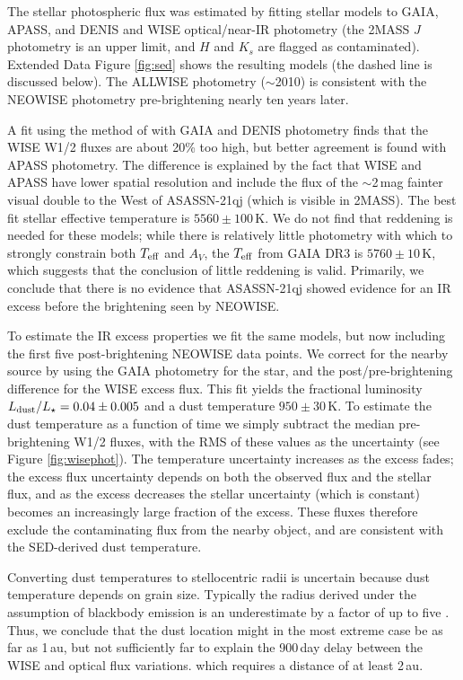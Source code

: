 \documentclass[sn-nature]{sn-jnl}%
\newcommand{\asas}{ASASSN-21qj}
\begin{document}
The stellar photospheric flux was estimated by fitting stellar models to GAIA, APASS, and DENIS and WISE optical/near-IR photometry (the 2MASS $J$ photometry is an upper limit, and $H$ and $K_s$ are flagged as contaminated).
%
Extended Data Figure \ref{fig:sed} shows the resulting models (the dashed line is discussed below).
%
The ALLWISE photometry ($\sim$2010) is consistent with the NEOWISE photometry pre-brightening nearly ten years later.
%

A fit using the method of \cite{2019MNRAS.488.3588Y} with GAIA and DENIS photometry finds that the WISE W1/2 fluxes are about 20\% too high, but better agreement is found with APASS photometry.
%
The difference is explained by the fact that WISE and APASS have lower spatial resolution and include the flux of the $\sim$2\,mag fainter visual double to the West of \asas{} (which is visible in 2MASS).
%
The best fit stellar effective temperature is $5560 \pm 100$\,K.
%
We do not find that reddening is needed for these models; while there is relatively little photometry with which to strongly constrain both $T_{\rm eff}$ and $A_V$, the $T_{\rm eff}$ from GAIA DR3 is $5760 \pm 10$\,K, which suggests that the conclusion of little reddening is valid.
%
Primarily, we conclude that there is no evidence that \asas{} showed evidence for an IR excess before the brightening seen by NEOWISE.

To estimate the IR excess properties we fit the same models, but now including the first five post-brightening NEOWISE data points.
%
We correct for the nearby source by using the GAIA photometry for the star, and the post/pre-brightening difference for the WISE excess flux.
%
This fit yields the fractional luminosity $L_{\rm dust}/L_\star = 0.04 \pm 0.005$ and a dust temperature $950 \pm 30$\,K.
%
To estimate the dust temperature as a function of time we simply subtract the median pre-brightening W1/2 fluxes, with the RMS of these values as the uncertainty (see Figure \ref{fig:wisephot}).
%
The temperature uncertainty increases as the excess fades; the excess flux uncertainty depends on both the observed flux and the stellar flux, and as the excess decreases the stellar uncertainty (which is constant) becomes an increasingly large fraction of the excess.
%
These fluxes therefore exclude the contaminating flux from the nearby object, and are consistent with the SED-derived dust temperature.

Converting dust temperatures to stellocentric radii is uncertain because dust temperature depends on grain size.
%
Typically the radius derived under the assumption of blackbody emission is an underestimate by a factor of up to five \citep{2013MNRAS.428.1263B,2015MNRAS.454.3207P}.
%
Thus, we conclude that the dust location might in the most extreme case be as far as 1\,au, but not sufficiently far to explain the 900\,day delay between the WISE and optical flux variations. which requires a distance of at least 2\,au.
\end{document}

